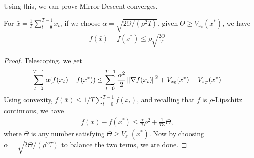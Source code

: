     Using this, we can prove Mirror Descent converges.
    \begin{lemma}
        \label{lem:classic-tele}
        For $\bar x = \frac{1}{T} \sum_{t=0}^{T-1} x_t$, if we choose $\alpha = \sqrt{2\Theta /(\rho^2 T)}$, given $\Theta \geq V_{x_0}(x^*)$, we have
        \begin{align*}
            f(\bar x) - f(x^*) \leq \rho \sqrt{\frac{2\Theta }{T}}
        \end{align*}
    \end{lemma}
    \begin{proof}
        Telescoping, we get
        \begin{align*}
            \sum_{t=0}^{T-1} \alpha (f(x_t) - f(x^*)) \leq \sum_{t=0}^{T-1} \frac{\alpha^2}{2} \left\lVert \nabla f(x_t) \right\rVert^2 + V_{x_0}(x^*) - V_{x_T}(x^*)
        \end{align*}
        Using convexity, $f(\bar x) \leq 1/T \sum_{t=0}^{T-1} f(x_t)$, and recalling that $f$ is $\rho$-Lipschitz continuous, we have
        \begin{align*}
            f(\bar x) - f(x^*) \leq \frac{\alpha}{2} \rho^2 + \frac{1}{T\alpha} \Theta,
        \end{align*}
        where $\Theta$ is any number satisfying $\Theta \geq V_{x_0}(x^*)$. Now by choosing $\alpha = \sqrt{2\Theta /(\rho^2 T)}$ to balance the two terms, we are done. 
    \end{proof}

